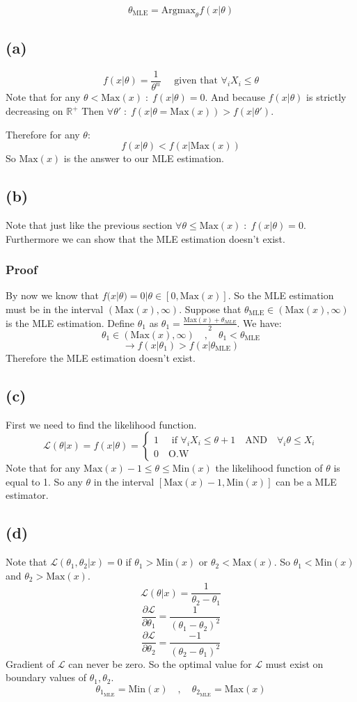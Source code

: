 $$
\theta_{\text{MLE}} = \text{Argmax}_\theta f(x|\theta)
$$
\subsection{(a)}
$$
f(x|\theta) = \frac{1}{\theta^n} \quad\text{ given that } \forall_iX_i \leq \theta
$$
Note that for any $\theta < \text{Max}(x)\;:\;f(x|\theta) = 0$. And because $f(x|\theta)$ is strictly decreasing on $\mathbb{R}^+$ Then 
$\forall \theta'\;:\;f(x|\theta = \text{Max}(x)) > f(x|\theta')$.

\noindent Therefore for any $\theta$:
$$
f(x|\theta) < f(x|\text{Max}(x))
$$
So $\text{Max}(x)$ is the answer to our MLE estimation.

\subsection{(b)}
Note that just like the previous section $\forall \theta \leq \text{Max}(x)\;:\;f(x|\theta) = 0$. Furthermore we can show that 
the MLE estimation doesn't exist.
\subsubsection{Proof}
By now we know that $f(x|\theta) = 0 | \theta\in[0, \text{Max}(x)]$. So the MLE estimation must be in the interval 
$(\text{Max}(x), \infty)$. Suppose that $\theta_{\text{MLE}} \in (\text{Max}(x), \infty)$ is the MLE estimation. Define 
$\theta_1$ as $\theta_1 = \frac{\text{Max}(x) + \theta_{MLE}}{2}$. We have:
$$
\theta_1\in(\text{Max}(x), \infty)\quad,\quad\theta_1 < \theta_{\text{MLE}}
$$
$$
\rightarrow f(x|\theta_1) > f(x|\theta_{\text{MLE}})
$$
Therefore the MLE estimation doesn't exist.
\subsection{(c)}
First we need to find the likelihood function.
$$
\mathcal{L}(\theta | x) = f(x | \theta) = \begin{cases}1\quad\text{ if }\forall_iX_i\leq\theta + 1\quad\text{AND}\quad\forall_i\theta \leq X_i\\0\quad\text{O.W}\end{cases}
$$
Note that for any $\text{Max}(x) - 1\leq\theta\leq\text{Min}(x)$ the likelihood function of $\theta$ is equal to 1. So any 
$\theta$ in the interval $[\text{Max}(x) - 1, \text{Min}(x)]$ can be a MLE estimator.
\subsection{(d)}
Note that $\mathcal{L}(\theta_1, \theta_2 | x) = 0$ if $\theta_1 > \text{Min}(x)$ or $\theta_2 < \text{Max}(x)$. So 
$\theta_1 < \text{Min}(x)$ and $\theta_2 > \text{Max}(x)$.
$$
\mathcal{L}(\theta | x) = \frac{1}{\theta_2 - \theta_1}
$$
$$
\frac{\partial\mathcal{L}}{\partial \theta_1} = \frac{1}{(\theta_1 - \theta_2)^2}
$$
$$
\frac{\partial\mathcal{L}}{\partial \theta_2} = \frac{-1}{(\theta_2 - \theta_1)^2}
$$
Gradient of $\mathcal{L}$ can never be zero. So the optimal value for $\mathcal{L}$ must exist on boundary values of $\theta_1, \theta_2$.
$$
\theta_{1_{\text{MLE}}} = \text{Min}(x)\quad,\quad\theta_{2_{\text{MLE}}} = \text{Max}(x)   
$$